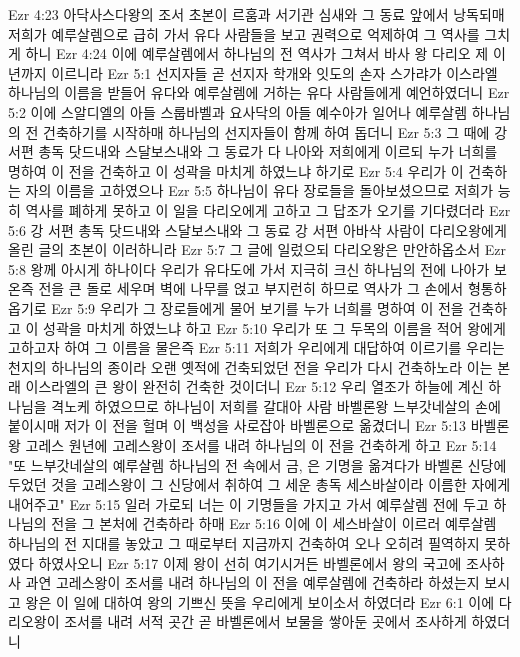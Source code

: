 Ezr 4:23  아닥사스다왕의 조서 초본이 르훔과 서기관 심새와 그 동료 앞에서 낭독되매 저희가 예루살렘으로 급히 가서 유다 사람들을 보고 권력으로 억제하여 그 역사를 그치게 하니
Ezr 4:24  이에 예루살렘에서 하나님의 전 역사가 그쳐서 바사 왕 다리오 제 이년까지 이르니라
Ezr 5:1  선지자들 곧 선지자 학개와 잇도의 손자 스가랴가 이스라엘 하나님의 이름을 받들어 유다와 예루살렘에 거하는 유다 사람들에게 예언하였더니
Ezr 5:2  이에 스알디엘의 아들 스룹바벨과 요사닥의 아들 예수아가 일어나 예루살렘 하나님의 전 건축하기를 시작하매 하나님의 선지자들이 함께 하여 돕더니
Ezr 5:3  그 때에 강 서편 총독 닷드내와 스달보스내와 그 동료가 다 나아와 저희에게 이르되 누가 너희를 명하여 이 전을 건축하고 이 성곽을 마치게 하였느냐 하기로
Ezr 5:4  우리가 이 건축하는 자의 이름을 고하였으나
Ezr 5:5  하나님이 유다 장로들을 돌아보셨으므로 저희가 능히 역사를 폐하게 못하고 이 일을 다리오에게 고하고 그 답조가 오기를 기다렸더라
Ezr 5:6  강 서편 총독 닷드내와 스달보스내와 그 동료 강 서편 아바삭 사람이 다리오왕에게 올린 글의 초본이 이러하니라
Ezr 5:7  그 글에 일렀으되 다리오왕은 만안하옵소서
Ezr 5:8  왕께 아시게 하나이다 우리가 유다도에 가서 지극히 크신 하나님의 전에 나아가 보온즉 전을 큰 돌로 세우며 벽에 나무를 얹고 부지런히 하므로 역사가 그 손에서 형통하옵기로
Ezr 5:9  우리가 그 장로들에게 물어 보기를 누가 너희를 명하여 이 전을 건축하고 이 성곽을 마치게 하였느냐 하고
Ezr 5:10  우리가 또 그 두목의 이름을 적어 왕에게 고하고자 하여 그 이름을 물은즉
Ezr 5:11  저희가 우리에게 대답하여 이르기를 우리는 천지의 하나님의 종이라 오랜 옛적에 건축되었던 전을 우리가 다시 건축하노라 이는 본래 이스라엘의 큰 왕이 완전히 건축한 것이더니
Ezr 5:12  우리 열조가 하늘에 계신 하나님을 격노케 하였으므로 하나님이 저희를 갈대아 사람 바벨론왕 느부갓네살의 손에 붙이시매 저가 이 전을 헐며 이 백성을 사로잡아 바벨론으로 옮겼더니
Ezr 5:13  바벨론 왕 고레스 원년에 고레스왕이 조서를 내려 하나님의 이 전을 건축하게 하고
Ezr 5:14  "또 느부갓네살의 예루살렘 하나님의 전 속에서 금, 은 기명을 옮겨다가 바벨론 신당에 두었던 것을 고레스왕이 그 신당에서 취하여 그 세운 총독 세스바살이라 이름한 자에게 내어주고"
Ezr 5:15  일러 가로되 너는 이 기명들을 가지고 가서 예루살렘 전에 두고 하나님의 전을 그 본처에 건축하라 하매
Ezr 5:16  이에 이 세스바살이 이르러 예루살렘 하나님의 전 지대를 놓았고 그 때로부터 지금까지 건축하여 오나 오히려 필역하지 못하였다 하였사오니
Ezr 5:17  이제 왕이 선히 여기시거든 바벨론에서 왕의 국고에 조사하사 과연 고레스왕이 조서를 내려 하나님의 이 전을 예루살렘에 건축하라 하셨는지 보시고 왕은 이 일에 대하여 왕의 기쁘신 뜻을 우리에게 보이소서 하였더라
Ezr 6:1  이에 다리오왕이 조서를 내려 서적 곳간 곧 바벨론에서 보물을 쌓아둔 곳에서 조사하게 하였더니
